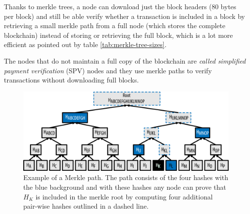  Thanks to merkle trees, a node can download just the block headers (80 bytes
 per block) and still be able verify whether a transaction is included in a
 block by retrieving a small merkle path from a full node (which stores the
 complete blockchain) instead of storing or retrieving the full block, which
 is a lot more efficient as pointed out by table \ref{tab:merkle-tree-sizes}.

 The nodes that do not maintain a full copy of the blockchain are \emph{called
 simplified payment verification} (SPV) nodes and they use merkle paths to
 verify transactions without downloading full blocks.

 \begin{table}[h!]
 \footnotesize

 \centering
 \caption{Merkle tree efficiency}
 \label{tab:merkle-tree-sizes}
 \end{table}


\begin{figure}[!htb]
	\centering
	\includegraphics[width=1\linewidth]{img/merkle-tree-path.png}
	\caption{Example of a Merkle path. The path consists of the four hashes with the
  blue background and with these hashes any node can prove that $H_K$ is included
  in the merkle root by computing four additional pair-wise hashes outlined in a
  dashed line.  }
	\label{fig:merkle-tree-path}
\end{figure}










